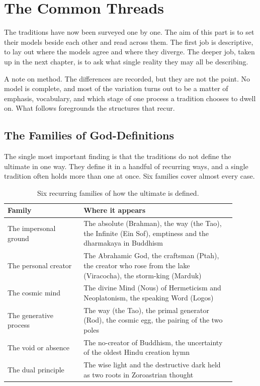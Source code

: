 \chapter{The Common Threads}

The traditions have now been surveyed one by one. The aim of this part is to set their models beside each
other and read across them. The first job is descriptive, to lay out where the models agree and where they
diverge. The deeper job, taken up in the next chapter, is to ask what single reality they may all be
describing.

A note on method. The differences are recorded, but they are not the point. No model is complete, and most
of the variation turns out to be a matter of emphasis, vocabulary, and which stage of one process a tradition
chooses to dwell on. What follows foregrounds the structures that recur.

\section{The Families of God-Definitions}

The single most important finding is that the traditions do not define the ultimate in one way. They define
it in a handful of recurring ways, and a single tradition often holds more than one at once. Six families
cover almost every case.

\begin{longtable}{L{0.30\linewidth} L{0.60\linewidth}}
\caption{Six recurring families of how the ultimate is defined.}\\
\toprule
\textbf{Family} & \textbf{Where it appears} \\
\midrule
The impersonal ground & The absolute (Brahman), the way (the Tao), the Infinite (Ein Sof), emptiness and the dharmakaya in Buddhism \\
The personal creator & The Abrahamic God, the craftsman (Ptah), the creator who rose from the lake (Viracocha), the storm-king (Marduk) \\
The cosmic mind & The divine Mind (Nous) of Hermeticism and Neoplatonism, the speaking Word (Logos) \\
The generative process & The way (the Tao), the primal generator (Rod), the cosmic egg, the pairing of the two poles \\
The void or absence & The no-creator of Buddhism, the uncertainty of the oldest Hindu creation hymn \\
The dual principle & The wise light and the destructive dark held as two roots in Zoroastrian thought \\
\bottomrule
\end{longtable}

